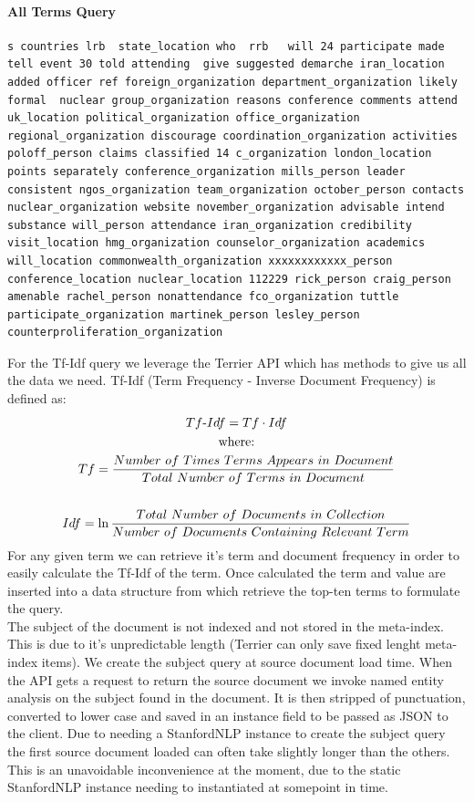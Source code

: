 \documentclass{l4proj}
\begin{document}
\paragraph{All Terms Query}
\begin{verbatim}
s countries lrb  state_location who  rrb   will 24 participate made tell event 30 told attending  give suggested demarche iran_location added officer ref foreign_organization department_organization likely formal  nuclear group_organization reasons conference comments attend uk_location political_organization office_organization regional_organization discourage coordination_organization activities poloff_person claims classified 14 c_organization london_location points separately conference_organization mills_person leader consistent ngos_organization team_organization october_person contacts nuclear_organization website november_organization advisable intend substance will_person attendance iran_organization credibility visit_location hmg_organization counselor_organization academics will_location commonwealth_organization xxxxxxxxxxxx_person conference_location nuclear_location 112229 rick_person craig_person amenable rachel_person nonattendance fco_organization tuttle participate_organization martinek_person lesley_person counterproliferation_organization
\end{verbatim}

For the Tf-Idf query we leverage the Terrier API which has methods to give us all the data we need.
Tf-Idf (Term Frequency - Inverse Document Frequency) is defined as:
\begin{gather*}
Tf\textnormal{-}Idf = Tf \cdot Idf \\
\textnormal{where:} \\ 
Tf = \frac{Number\ of\ Times\ Terms\ Appears\ in\ Document}{Total\ Number\ of\ Terms\ in\ Document} \\ \\
Idf = \ln{\frac{Total\ Number\ of\ Documents\ in\ Collection}{Number\ of\ Documents\ Containing\ Relevant\ Term}}
\end{gather*}
For any given term we can retrieve it's term and document frequency in order to easily calculate the Tf-Idf of the term. Once calculated the term and value are inserted into a data structure from which retrieve the top-ten terms to formulate the query.\\
The subject of the document is not indexed and not stored in the meta-index. This is due to it's unpredictable length (Terrier can only save fixed lenght meta-index items). We create the subject query at source document load time. When the API gets a request to return the source document we invoke named entity analysis on the subject found in the document. It is then stripped of punctuation, converted to lower case and saved in an instance field to be passed as JSON to the client. Due to needing a StanfordNLP instance to create the subject query the first source document loaded can often take slightly longer than the others. This is an unavoidable inconvenience at the moment, due to the static StanfordNLP instance needing to instantiated at somepoint in time.\\
\end{document}

